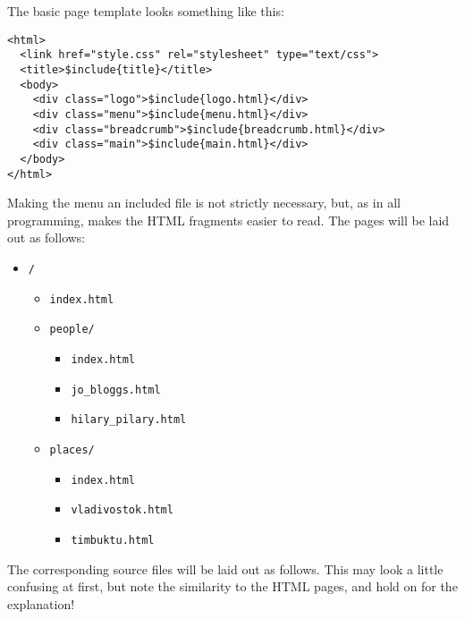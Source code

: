 \documentclass[english]{scrartcl}
\begin{document}
The basic page template looks something like this:

\begin{verbatim}
<html>
  <link href="style.css" rel="stylesheet" type="text/css">
  <title>$include{title}</title>
  <body>
    <div class="logo">$include{logo.html}</div>
    <div class="menu">$include{menu.html}</div>
    <div class="breadcrumb">$include{breadcrumb.html}</div>
    <div class="main">$include{main.html}</div>
  </body>
</html>
\end{verbatim}

Making the menu an included file is not strictly necessary, but, as in all programming, makes the HTML fragments easier to read. The pages will be laid out as follows:

\begin{itemize}
\item \verb|/|
  \begin{itemize}
  \item \verb|index.html|
  \item \verb|people/|
    \begin{itemize}
    \item \verb|index.html|
    \item \verb|jo_bloggs.html|
    \item \verb|hilary_pilary.html|
    \end{itemize}
  \item \verb|places/|
    \begin{itemize}
    \item \verb|index.html|
    \item \verb|vladivostok.html|
    \item \verb|timbuktu.html|
    \end{itemize}
  \end{itemize}
\end{itemize}

The corresponding source files will be laid out as follows. This may look a little confusing at first, but note the similarity to the HTML pages, and hold on for the explanation!
\end{document}
